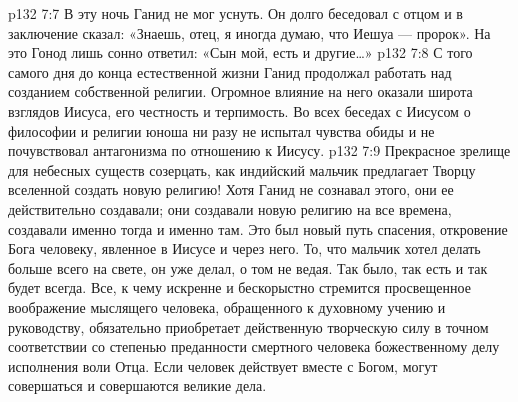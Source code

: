 \vs p132 7:7 \pc В эту ночь Ганид не мог уснуть. Он долго беседовал с отцом и в заключение сказал: «Знаешь, отец, я иногда думаю, что Иешуа --- пророк». На это Гонод лишь сонно ответил: «Сын мой, есть и другие\ldots »
\vs p132 7:8 С того самого дня до конца естественной жизни Ганид продолжал работать над созданием собственной религии. Огромное влияние на него оказали широта взглядов Иисуса, его честность и терпимость. Во всех беседах с Иисусом о философии и религии юноша ни разу не испытал чувства обиды и не почувствовал антагонизма по отношению к Иисусу.
\vs p132 7:9 \pc Прекрасное зрелище для небесных существ созерцать, как индийский мальчик предлагает Творцу вселенной создать новую религию! Хотя Ганид не сознавал этого, они ее действительно создавали; они создавали новую религию на все времена, создавали именно тогда и именно там. Это был новый путь спасения, откровение Бога человеку, явленное в Иисусе и через него. То, что мальчик хотел делать больше всего на свете, он уже делал, о том не ведая. Так было, так есть и так будет всегда. Все, к чему искренне и бескорыстно стремится просвещенное воображение мыслящего человека, обращенного к духовному учению и руководству, обязательно приобретает действенную творческую силу в точном соответствии со степенью преданности смертного человека божественному делу исполнения воли Отца. Если человек действует вместе с Богом, могут совершаться и совершаются великие дела.
